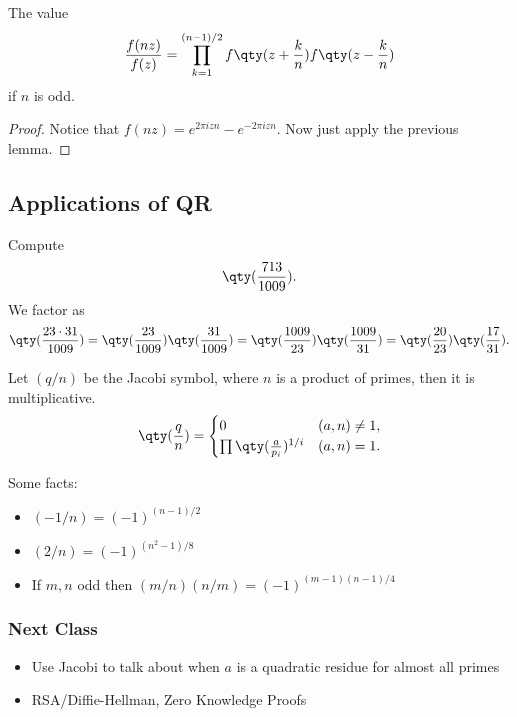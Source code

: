 \begin{lemma}
The value
\[ \frac{f(nz)}{f(z)} = \prod_{k=1}^{(n-1)/2} f\qty(z + \frac{k}{n})f\qty(z - \frac{k}{n}) \]
if $n$ is odd.
\end{lemma}
\begin{proof}
Notice that $f(nz) = e^{2\pi i zn} - e^{-2\pi i zn}$. Now just apply the previous lemma.
\end{proof}

\subsection{Applications of QR}
\pagebreak
\begin{example}
Compute
\[ \qty(\frac{713}{1009}). \]
We factor as 
\[ \qty(\frac{23 \cdot 31}{1009}) = \qty(\frac{23}{1009})\qty(\frac{31}{1009}) = \qty(\frac{1009}{23})\qty(\frac{1009}{31}) = \qty(\frac{20}{23})\qty(\frac{17}{31}). \]
\end{example}

\begin{definition}
Let $(q/n)$ be the Jacobi symbol, where $n$ is a product of primes, then it is multiplicative.
\[
\qty(\frac{q}{n}) = \begin{cases}
0 & (a,n) \not= 1, \\
\prod \qty(\frac{a}{p_i})^{1/i} & (a,n) = 1.
\end{cases}
\]
\end{definition}

\begin{theorem}
Some facts:
\begin{itemize}
\item $(-1/n) = (-1)^{(n-1)/2}$
\item $(2/n) = (-1)^{(n^2-1)/8}$
\item If $m,n$ odd then $(m/n)(n/m) = (-1)^{(m-1)(n-1)/4}$
\end{itemize}
\end{theorem}

\subsubsection*{Next Class}
\begin{itemize}
\item Use Jacobi to talk about when $a$ is a quadratic residue for almost all primes
\item RSA/Diffie-Hellman, Zero Knowledge Proofs
\end{itemize}